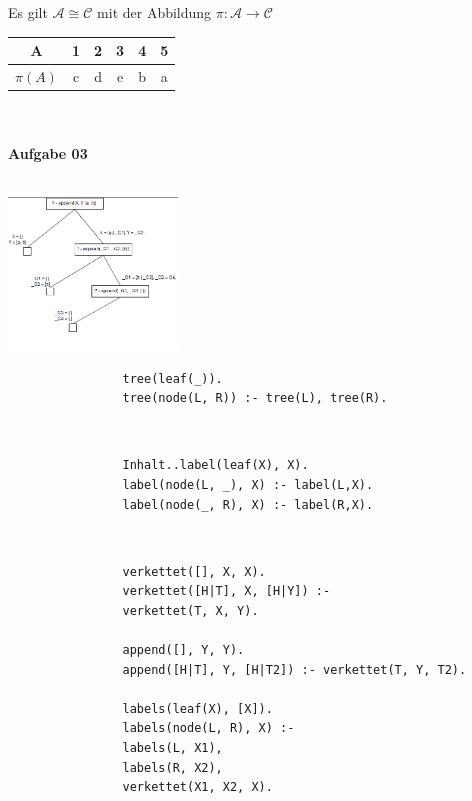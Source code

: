 \documentclass[a4paper,10pt]{article}
\begin{document}
\begin{compactenum} [(a)]
\begin{compactitem}
\begin{compactitem}
			\end{compactitem}
			\item Es gilt $ \mathcal{A} \cong \mathcal{C}$ mit der Abbildung $ \pi : \mathcal{A} \rightarrow \mathcal{C} $\\
			\begin{tabular} {c|c|c|c|c|c}
				A & 1 & 2 & 3 & 4 & 5 \\ \hline
				$ \pi(A) $ & c & d & e & b & a
			\end{tabular}
		\end{compactitem}
	\end{compactenum}\ \\ \\
		\textbf{Aufgabe 03}\\
		\begin{compactenum} [(a)]
			\item \ \\ \includegraphics[width=4.5cm]{Blatt06_4a}\\
			\item 
			\begin{verbatim}
				tree(leaf(_)).
				tree(node(L, R)) :- tree(L), tree(R).	
			\end{verbatim} \ \\
			\item 
			\begin{verbatim}
				Inhalt..label(leaf(X), X).
				label(node(L, _), X) :- label(L,X).
				label(node(_, R), X) :- label(R,X).
			\end{verbatim} \\
			\item 
			\begin{verbatim}
				verkettet([], X, X).
				verkettet([H|T], X, [H|Y]) :-
				verkettet(T, X, Y).
				
				append([], Y, Y).
				append([H|T], Y, [H|T2]) :- verkettet(T, Y, T2).
			
				labels(leaf(X), [X]).
				labels(node(L, R), X) :-
				labels(L, X1),
				labels(R, X2),
				verkettet(X1, X2, X).
			\end{verbatim}
			
		\end{compactenum}
\end{document}
